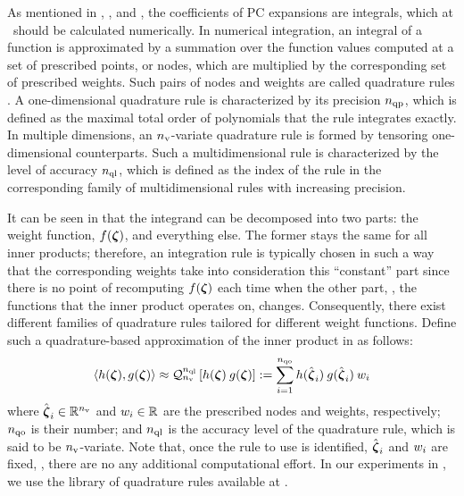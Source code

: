
As mentioned in , , and , the coefficients of PC expansions are integrals, which at \ should be calculated numerically.
In numerical integration, an integral of a function is approximated by a summation over the function values computed at a set of prescribed points, or nodes, which are multiplied by the corresponding set of prescribed weights.
Such pairs of nodes and weights are called quadrature rules \cite{press2007}.
A one-dimensional quadrature rule is characterized by its precision ${n_\text{qp}}$, which is defined as the maximal total order \cite{heiss2008} of polynomials that the rule integrates exactly.
In multiple dimensions, an ${n_\text{v}}$-variate quadrature rule is formed by tensoring one-dimensional counterparts. Such a multidimensional rule is characterized by the level of accuracy ${n_\text{ql}}$, which is defined as the index of the rule in the corresponding family of multidimensional rules with increasing precision.

It can be seen in  that the integrand can be decomposed into two parts: the weight function, $f(\boldsymbol{\zeta})$, and everything else.
The former stays the same for all inner products; therefore, an integration rule is typically chosen in such a way that the corresponding weights take into consideration this ``constant'' part since there is no point of recomputing $f(\boldsymbol{\zeta})$ each time when the other part, \ie, the functions that the inner product operates on, changes.
Consequently, there exist different families of quadrature rules tailored for different weight functions.
Define such a quadrature-based approximation of the inner product in  as follows:
\[
  \oInner{h(\vz)}{g(\vz)} \approx \oQuad{\nvars}{\qdlevel}{h(\vz) \: g(\vz)} := \sum_{i = 1}^{\qdorder} h(\qdn{\vz}_i) \: g(\qdn{\vz}_i) \: \qdw_i
\]
where $\hat{\boldsymbol{\zeta}}_i \in \mathbb{R}^{n_\text{v}}$ and $w_i \in \mathbb{R}$ are the prescribed nodes and weights, respectively; ${n_\text{qo}}$ is their number; and ${n_\text{ql}}$ is the accuracy level of the quadrature rule, which is said to be ${n_\text{v}}$-variate.
Note that, once the rule to use is identified, $\hat{\boldsymbol{\zeta}}_i$ and $w_i$ are fixed, \ie, there are no any additional computational effort.
In our experiments in , we use the library of quadrature rules available at \cite{burkardt2013}.


